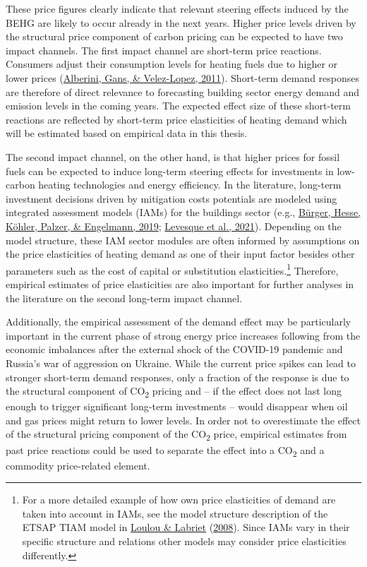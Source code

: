 \documentclass[12pt,twoside]{reedthesis}
\begin{document}
These price figures clearly indicate that relevant steering effects induced by the BEHG are likely to occur already in the next years. Higher price levels driven by the structural price component of carbon pricing can be expected to have two impact channels. The first impact channel are short-term price reactions. Consumers adjust their consumption levels for heating fuels due to higher or lower prices (\protect\hyperlink{ref-alberini_etal11}{Alberini, Gans, \& Velez-Lopez, 2011}). Short-term demand responses are therefore of direct relevance to forecasting building sector energy demand and emission levels in the coming years. The expected effect size of these short-term reactions are reflected by short-term price elasticities of heating demand which will be estimated based on empirical data in this thesis.

The second impact channel, on the other hand, is that higher prices for fossil fuels can be expected to induce long-term steering effects for investments in low-carbon heating technologies and energy efficiency. In the literature, long-term investment decisions driven by mitigation costs potentials are modeled using integrated assessment models (IAMs) for the buildings sector (e.g., \protect\hyperlink{ref-burger_etal19}{Bürger, Hesse, Köhler, Palzer, \& Engelmann, 2019}; \protect\hyperlink{ref-levesque_etal21}{Levesque et al., 2021}). Depending on the model structure, these IAM sector modules are often informed by assumptions on the price elasticities of heating demand as one of their input factor besides other parameters such as the cost of capital or substitution elasticities.\footnote{For a more detailed example of how own price elasticities of demand are taken into account in IAMs, see the model structure description of the ETSAP TIAM model in \protect\hyperlink{ref-loulou_labriet08}{Loulou \& Labriet} (\protect\hyperlink{ref-loulou_labriet08}{2008}). Since IAMs vary in their specific structure and relations other models may consider price elasticities differently.} Therefore, empirical estimates of price elasticities are also important for further analyses in the literature on the second long-term impact channel.

Additionally, the empirical assessment of the demand effect may be particularly important in the current phase of strong energy price increases following from the economic imbalances after the external shock of the COVID-19 pandemic and Russia's war of aggression on Ukraine. While the current price spikes can lead to stronger short-term demand responses, only a fraction of the response is due to the structural component of CO\textsubscript{2} pricing and -- if the effect does not last long enough to trigger significant long-term investments -- would disappear when oil and gas prices might return to lower levels. In order not to overestimate the effect of the structural pricing component of the CO\textsubscript{2} price, empirical estimates from past price reactions could be used to separate the effect into a CO\textsubscript{2} and a commodity price-related element.
\end{document}
